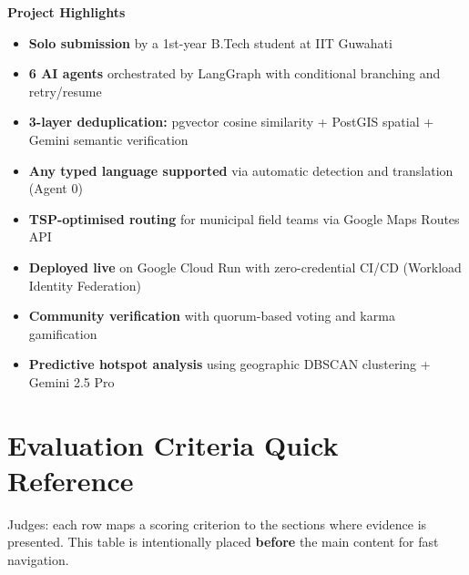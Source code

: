 \documentclass[11pt,a4paper]{article}
\begin{document}
\begin{tcolorbox}[
  enhanced, breakable,
  colback=cpteal!4, colframe=cpteal!4,
  borderline west={3.5pt}{0pt}{cpteal},
  sharp corners, boxrule=0pt,
  left=8pt, right=8pt, top=8pt, bottom=8pt,
  drop shadow
]
{\sffamily\bfseries\color{cpteal}\large Project Highlights}
\vspace{4pt}
\begin{itemize}[leftmargin=1.2em, itemsep=3pt]
  \item \textbf{Solo submission} by a 1st-year B.Tech student at IIT Guwahati
  \item \textbf{6 AI agents} orchestrated by LangGraph with conditional branching and retry/resume
  \item \textbf{3-layer deduplication:} pgvector cosine similarity + PostGIS spatial + Gemini semantic verification
  \item \textbf{Any typed language supported} via automatic detection and translation (Agent 0)
  \item \textbf{TSP-optimised routing} for municipal field teams via Google Maps Routes API
  \item \textbf{Deployed live} on Google Cloud Run with zero-credential CI/CD (Workload Identity Federation)
  \item \textbf{Community verification} with quorum-based voting and karma gamification
  \item \textbf{Predictive hotspot analysis} using geographic DBSCAN clustering + Gemini 2.5 Pro
\end{itemize}
\end{tcolorbox}
\vspace{6pt}

\section*{Evaluation Criteria Quick Reference}
\label{sec:eval}

\begin{importantbox}
Judges: each row maps a scoring criterion to the sections where evidence is presented. This table is intentionally placed \textbf{before} the main content for fast navigation.
\end{importantbox}
\end{document}
